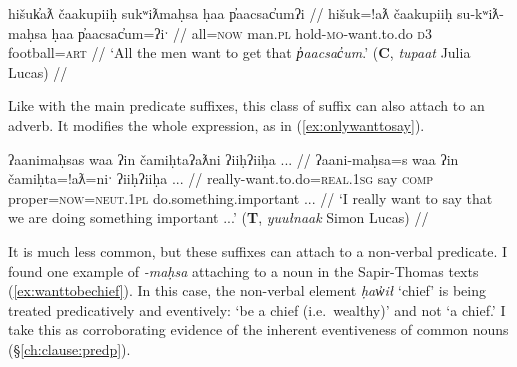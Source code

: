 \ex \label{ex:wanttograb}
\begingl
\glpreamble hišuk̓aƛ čaakupiiḥ sukʷiƛmaḥsa ḥaa p̓aacsac̓umʔi //
\gla hišuk=!aƛ čaakupiiḥ su-kʷiƛ-maḥsa ḥaa p̓aacsac̓um=ʔiˑ //
\glb all=\textsc{now} man.\textsc{pl} hold-\textsc{mo}-want.to.do \textsc{d3} football\footnotemark=\textsc{art} //
\glft `All the men want to get that \textit{p̓aacsac̓um}.' (\textbf{C}, \textit{tupaat} Julia Lucas) //
\endgl
\xe



Like with the main predicate suffixes, this class of suffix can also attach to an adverb. It modifies the whole expression, as in (\ref{ex:onlywanttosay}).

\ex \label{ex:onlywanttosay}
\begingl
\glpreamble ʔaanimaḥsas waa ʔin čamiḥtaʔaƛni ʔiiḥʔiiḥa ... //
\gla ʔaani-maḥsa=s waa ʔin čamiḥta=!aƛ=niˑ ʔiiḥʔiiḥa ... //
\glb really-want.to.do=\textsc{real.1sg} say \textsc{comp} proper=\textsc{now}=\textsc{neut.1pl} do.something.important ... //
\glft `I really want to say that we are doing something important ...' (\textbf{T}, \textit{yuułnaak} Simon Lucas) //
\endgl
\xe


It is much less common, but these suffixes can attach to a non-verbal predicate. I found one example of \textit{-maḥsa} attaching to a noun in the Sapir-Thomas texts (\ref{ex:wanttobechief}). In this case, the non-verbal element \textit{ḥaw̓ił} `chief' is being treated predicatively and eventively: `be a chief (i.e.\ wealthy)' and not `a chief.' I take this as corroborating evidence of the inherent eventiveness of common nouns (\S\ref{ch:clause:predp}).

